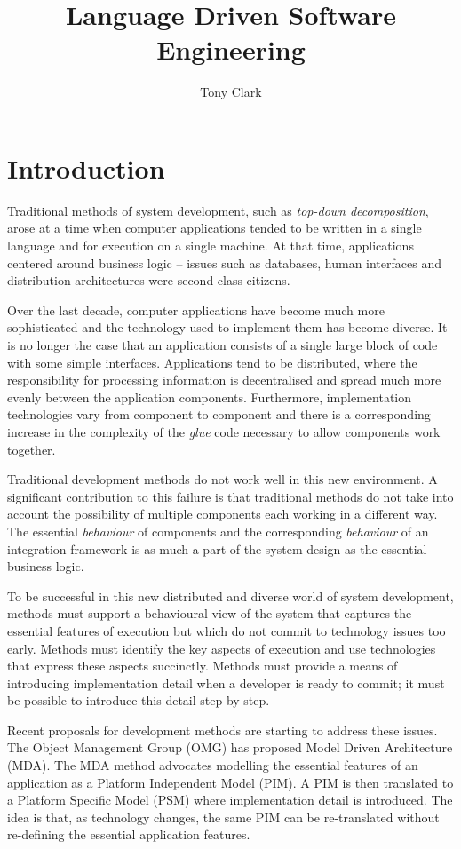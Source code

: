 \documentclass{article}
\title{Language Driven Software Engineering}
\author{Tony Clark}
\begin{document}
\maketitle

\section{Introduction}

Traditional methods of system development, such as {\em top-down decomposition}, arose at a time
when computer applications tended to be written in a single language and for execution on a single 
machine. At that time, applications centered around business logic -- issues such as databases,
human interfaces and distribution architectures were second class citizens.

Over the last decade, computer applications have become much more sophisticated and the technology
used to implement them has become diverse. It is no longer the case that an application consists
of a single large block of code with some simple interfaces. Applications tend to be distributed,
where the responsibility for processing information is decentralised and spread much more evenly
between the application components. Furthermore, implementation technologies vary from component
to component and there is a corresponding increase in the complexity of the {\em glue} code
necessary to allow components work together.

Traditional development methods do not work well in this new environment. A significant contribution
to this failure is that traditional methods do not take into account the possibility of
multiple components each working in a different way. The essential {\em behaviour} of components
and the corresponding {\em behaviour} of an integration framework is as much a part of the
system design as the essential business logic.

To be successful in this new distributed and diverse world of system development, methods must
support a behavioural view of the system that captures the essential features of execution
but which do not commit to technology issues too early. Methods must identify the key aspects of
execution and use technologies that express these aspects succinctly. Methods must provide
a means of introducing implementation detail when a developer is ready to commit; it must
be possible to introduce this detail step-by-step. 

Recent proposals for development methods are starting to address these issues. The Object
Management Group (OMG) has proposed Model Driven Architecture (MDA). The MDA method advocates
modelling the essential features of an application as a Platform Independent Model (PIM). A
PIM is then translated to a Platform Specific Model (PSM) where implementation detail is
introduced. The idea is that, as technology changes, the same PIM can be re-translated 
without re-defining the essential application features. 
\end{document}
